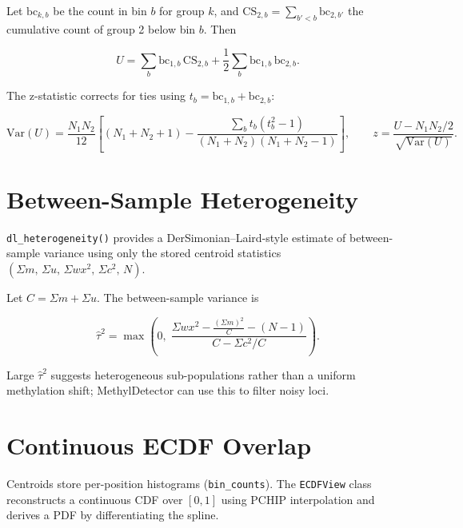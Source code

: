 \documentclass[11pt]{article}
\begin{document}
Let \(\mathrm{bc}_{k,b}\) be the count in bin $b$ for group $k$, and
\(\mathrm{CS}_{2,b} = \sum_{b'<b}\mathrm{bc}_{2,b'}\) the cumulative count of
group 2 below bin $b$.  Then

\begin{equation}
  U = \sum_{b} \mathrm{bc}_{1,b}\,\mathrm{CS}_{2,b}
      + \frac{1}{2}\sum_{b} \mathrm{bc}_{1,b}\,\mathrm{bc}_{2,b}.
\end{equation}

The z-statistic corrects for ties using \(t_b = \mathrm{bc}_{1,b}+\mathrm{bc}_{2,b}\):

\begin{equation}
  \mathrm{Var}(U) = \frac{N_1 N_2}{12}
    \left[(N_1+N_2+1) - \frac{\sum_b t_b(t_b^2-1)}{(N_1+N_2)(N_1+N_2-1)}\right],
  \qquad z = \frac{U - N_1 N_2/2}{\sqrt{\mathrm{Var}(U)}}.
\end{equation}

\section{Between-Sample Heterogeneity}

\texttt{dl\_heterogeneity()} provides a DerSimonian--Laird-style estimate of
between-sample variance using only the stored centroid statistics
\((\Sigma m,\,\Sigma u,\,\Sigma w x^2,\,\Sigma c^2,\,N)\).

Let \(C = \Sigma m + \Sigma u\).  The between-sample variance is

\begin{equation}
  \hat\tau^2 = \max\!\left(0,\;
    \frac{\displaystyle\Sigma w x^2 - \frac{(\Sigma m)^2}{C}
          - (N-1)}{C - \Sigma c^2/C}
  \right).
\end{equation}

Large \(\hat\tau^2\) suggests heterogeneous sub-populations rather than a
uniform methylation shift; MethylDetector can use this to filter noisy loci.

\section{Continuous ECDF Overlap}

Centroids store per-position histograms (\texttt{bin\_counts}).  The
\texttt{ECDFView} class reconstructs a continuous CDF over \([0,1]\) using
PCHIP interpolation and derives a PDF by differentiating the spline.
\end{document}
